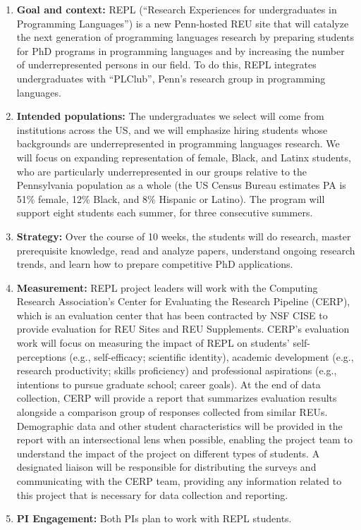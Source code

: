 \begin{enumerate}
\item {\bf Goal and context:} REPL (``Research Experiences for
undergraduates in Programming Languages'') is a new
Penn-hosted REU site that will catalyze the next generation of
programming languages research by preparing students for PhD programs
in programming languages and by increasing the number of
underrepresented persons in our field. To do this, REPL integrates
undergraduates with ``PLClub'', Penn’s research group in programming
languages.

\item {\bf Intended populations:} The undergraduates we select will
come from institutions across the US, and we will emphasize hiring
students whose backgrounds are underrepresented in programming
languages research. We will focus on expanding representation of
female, Black, and Latinx students, who are particularly
underrepresented in our
groups relative to the Pennsylvania population as a whole (the US Census Bureau
estimates PA is 51\% female, 12\% Black, and 8\% Hispanic or Latino).  The
program will support eight students  each
summer, for three consecutive summers.
\item {\bf Strategy:} Over the course of 10 weeks, the students will do
research, master prerequisite knowledge, read and analyze papers, understand
ongoing research trends, and learn how to prepare competitive PhD applications.
\item {\bf Measurement:}
REPL project leaders will work with the Computing Research Association’s Center for Evaluating the Research Pipeline (CERP), which is an evaluation center that has been contracted by NSF CISE to provide evaluation for REU Sites and REU Supplements. CERP’s evaluation work will focus on measuring the impact of REPL on students’ self-perceptions (e.g., self-efficacy; scientific identity), academic development (e.g., research productivity; skills proficiency) and professional aspirations (e.g., intentions to pursue graduate school; career goals). At the end of data collection, CERP will provide a report that summarizes evaluation results alongside a comparison group of responses collected from similar REUs. Demographic data and other student characteristics will be provided in the report with an intersectional lens when possible, enabling the project team to understand the impact of the project on different types of students. A designated liaison will be responsible for distributing the surveys and communicating with the CERP team, providing any information related to this project that is necessary for data collection and reporting.
\item {\bf PI Engagement:} Both PIs plan to work with REPL students.
%
\iflater{}\fi

\end{enumerate}

